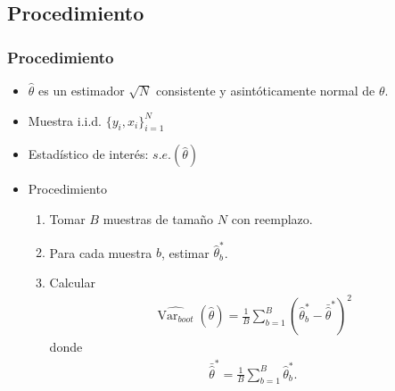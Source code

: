 \documentclass[t, compress, spanish, aspectratio=169]{beamer}
\DeclareMathOperator{\Var}{Var}
\begin{document}
\subsection{Procedimiento}
\begin{frame}
    \frametitle{Procedimiento}
    \begin{itemize}  [<+->]
        \item $\hat \theta$ es un estimador $\sqrt{N}$ consistente y asint\'oticamente normal de $\theta$.
        \item Muestra i.i.d. $\{y_i,x_i\}_{i=1}^{N}$
        \item Estad\'istico de inter\'es: $s.e.(\hat \theta)$
        \item Procedimiento
        \begin{enumerate}
            \item Tomar $B$ muestras de tama\~no $N$ con reemplazo.
            \item Para cada muestra $b$, estimar $\hat \theta^*_b$.
            \item Calcular 
            \begin{align*}
                \widehat{\Var_{boot}} (\hat \theta)=\frac{1}{B}\sum_{b=1}^B(\hat \theta^*_b-\bar{\hat{\theta}}^*)^2
            \end{align*}
            donde
            \begin{align*}
                \bar{\hat{\theta}}^*= \frac{1}{B}\sum_{b=1}^B \hat \theta^*_b.
            \end{align*}
        \end{enumerate}
    \end{itemize}
\end{frame}
\end{document}
